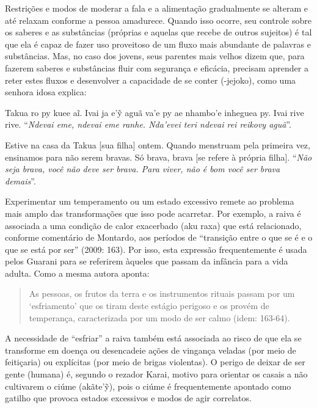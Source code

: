 Restrições e modos de moderar a fala e a alimentação gradualmente se
alteram e até relaxam conforme a pessoa amadurece. Quando isso ocorre,
seu controle sobre os saberes e as substâncias (próprias e aquelas que
recebe de outros sujeitos) é tal que ela é capaz de fazer uso
proveitoso de um fluxo mais abundante de palavras e substâncias. Mas,
no caso dos jovens, seus parentes mais velhos dizem que, para fazerem
saberes e substâncias fluir com segurança e eficácia, precisam aprender
a reter estes fluxos e desenvolver a capacidade de se conter (-jejoko),
como uma senhora idosa explica:

\bigskip

\begin{paracol}{2}
\footnotesize
\bigskip
Takua ro py kuee aĩ. Ivai ja e'ỹ aguã va'e py ae nhambo'e inheguea py.
Ivai rive rive. ``\emph{Ndevai eme, ndevai eme ranhe. Nda'evei teri
ndevai rei reikovy aguã}''.

\switchcolumn
Estive na casa da Takua [sua filha] ontem. Quando menstruam pela
primeira vez, ensinamos para não serem bravas. Só brava, brava [se
refere à própria filha]. ``\emph{Não seja brava, você não deve ser
brava. Para viver, não é bom você ser brava demais}''.
\end{paracol}

\bigskip

Experimentar um temperamento ou um estado excessivo remete ao problema
mais amplo das transformações que isso pode acarretar. Por exemplo, a
raiva é associada a uma condição de calor exacerbado (aku raxa) que
está relacionado, conforme comentário de Montardo, aos períodos de
``transição entre o que se é e o que se está por ser'' (2009: 163). Por
isso, esta expressão frequentemente é usada pelos Guarani para se
referirem àqueles que passam da infância para a vida adulta. Como a
mesma autora aponta: 

\begin{quotation}
\noindent
As pessoas, os frutos da terra e os instrumentos rituais passam por um
‘esfriamento’ que os tiram deste estágio perigoso e os provém de
temperança, caracterizada por um modo de ser calmo (idem: 163-64). 

\end{quotation}
A necessidade de ``esfriar'' a raiva também está associada ao risco de que
ela se transforme em doença ou desencadeie ações de vingança veladas
(por meio de feitiçaria) ou explícitas (por meio de brigas violentas).
O perigo de deixar de ser gente (humana) é, segundo o rezador Karai,
motivo para orientar os casais a não cultivarem o ciúme
(akãte’\~{y}), pois o ciúme é frequentemente apontado como gatilho
que provoca estados excessivos e modos de agir correlatos. 


